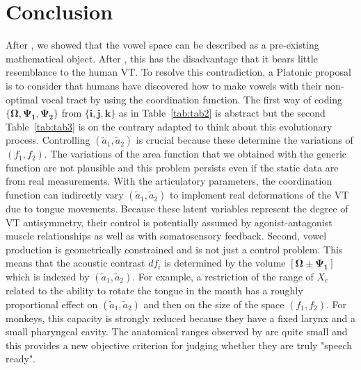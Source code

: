 \documentclass[10pt,twocolumn]{article}
\let\cite\citep                             %
\begin{document}
\section{\label{sec:6} Conclusion}
After \cite{Carre2004,Carre2009}, we showed that the vowel space can be described as a pre-existing mathematical object. After \cite{BoePerrier1990}, this has the disadvantage that it bears little resemblance to the human VT. To resolve this contradiction, a Platonic proposal is to consider that humans have discovered how to make vowels with their non-optimal vocal tract by using the coordination function. The first way of coding $\{\bm{\Omega},\bm{\Psi_1},\bm{\Psi_2}\}$ from $\{\bm{i},\bm{j},\bm{k}\}$ as in Table~\ref{tab:tab2} is abstract but the second Table~\ref{tab:tab3} is on the contrary adapted to think about this evolutionary process. Controlling $(\tilde{a}_1, \tilde{a}_2)$ is crucial because these determine the variations of $(f_1,f_2)$. The variations of the area function that we obtained with the generic function are not plausible and this problem persists even if the static data are from real measurements. With the articulatory parameters, the coordination function can indirectly vary $(\tilde{a}_1,\tilde{a}_2)$ to implement real deformations of the VT due to tongue movements. Because these latent variables represent the degree of VT antisymmetry, their control is potentially assumed by agonist-antagonist muscle relationships as well as with somatosensory feedback. Second, vowel production is geometrically constrained and is not just a control problem. This means that the acoustic contrast $df_i$ is determined by the volume $\left[\bm{\Omega}\pm\bm{\Psi_1}\right]$ which is indexed by $(\tilde{a}_1, \tilde{a}_2)$. For example, a restriction of the range of $X_c$ related to the ability to rotate the tongue in the mouth has a roughly proportional effect on $(\tilde{a}_1, \tilde{a}_2)$ and then on the size of the space $(f_1, f_2)$. For monkeys, this capacity is strongly reduced because they have a fixed larynx and a small pharyngeal cavity. The anatomical ranges observed by \cite{Fitch2016} are quite small and this provides a new objective criterion for judging whether they are truly "speech ready".
\end{document}
